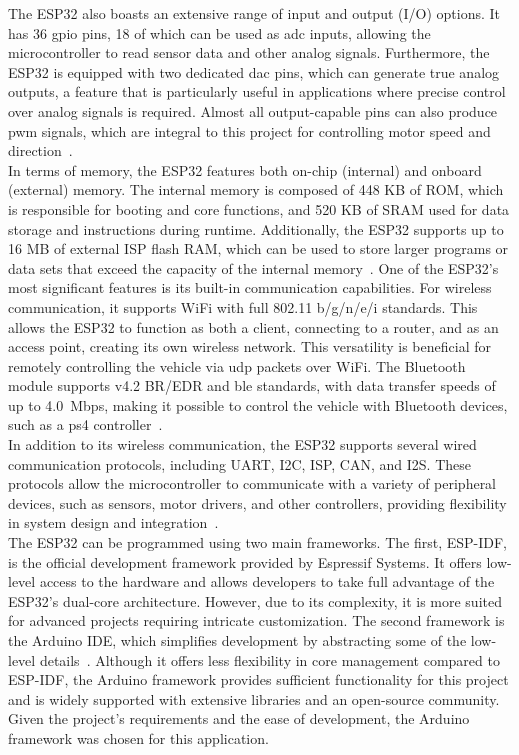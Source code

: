 The ESP32 also boasts an extensive range of input and output (I/O) options. It has 36 \ac{gpio} pins, 18 of which can be used as \ac{adc} inputs, allowing the microcontroller to read sensor data and other analog signals. Furthermore, the ESP32 is equipped with two dedicated \ac{dac} pins, which can generate true analog outputs, a feature that is particularly useful in applications where precise control over analog signals is required. Almost all output-capable pins can also produce \ac{pwm} signals, which are integral to this project for controlling motor speed and direction~\cite{Kareem.2021}.\\
In terms of memory, the ESP32 features both on-chip (internal) and onboard (external) memory. The internal memory is composed of 448 KB of ROM, which is responsible for booting and core functions, and 520 KB of SRAM used for data storage and instructions during runtime. Additionally, the ESP32 supports up to 16 MB of external ISP flash RAM, which can be used to store larger programs or data sets that exceed the capacity of the internal memory~\cite{Kareem.2021}.
One of the ESP32’s most significant features is its built-in communication capabilities. For wireless communication, it supports WiFi with full 802.11 b/g/n/e/i standards. This allows the ESP32 to function as both a client, connecting to a router, and as an access point, creating its own wireless network. This versatility is beneficial for remotely controlling the vehicle via \ac{udp} packets over WiFi. The Bluetooth module supports v4.2 BR/EDR and \ac{ble} standards, with data transfer speeds of up to 4.0~Mbps, making it possible to control the vehicle with Bluetooth devices, such as a \ac{ps4} controller~\cite{Kareem.2021}.\\
In addition to its wireless communication, the ESP32 supports several wired communication protocols, including UART, I2C, ISP, CAN, and I2S. These protocols allow the microcontroller to communicate with a variety of peripheral devices, such as sensors, motor drivers, and other controllers, providing flexibility in system design and integration~\cite{Kareem.2021}.\\
The ESP32 can be programmed using two main frameworks. The first, ESP-IDF, is the official development framework provided by Espressif Systems. It offers low-level access to the hardware and allows developers to take full advantage of the ESP32's dual-core architecture. However, due to its complexity, it is more suited for advanced projects requiring intricate customization. The second framework is the Arduino IDE, which simplifies development by abstracting some of the low-level details~\cite{Kareem.2021}. Although it offers less flexibility in core management compared to ESP-IDF, the Arduino framework provides sufficient functionality for this project and is widely supported with extensive libraries and an open-source community. Given the project's requirements and the ease of development, the Arduino framework was chosen for this application.